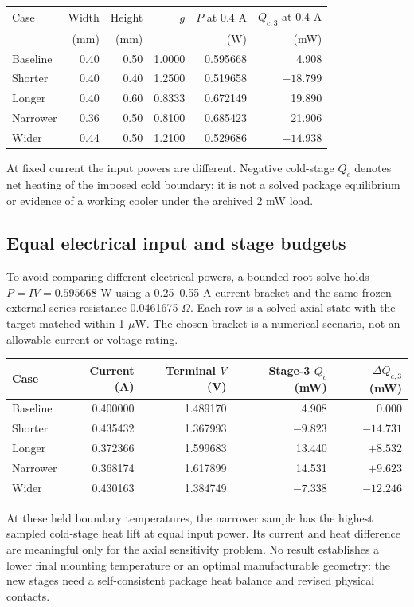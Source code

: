 \begin{center}\small
\begin{tabular}{lrrrrr}\toprule
Case & Width & Height & $g$ & $P$ at 0.4 A & $Q_{c,3}$ at 0.4 A\\
 & (mm) & (mm) & & (W) & (mW)\\\midrule
Baseline & 0.40 & 0.50 & 1.0000 & 0.595668 & 4.908\\
Shorter & 0.40 & 0.40 & 1.2500 & 0.519658 & $-18.799$\\
Longer & 0.40 & 0.60 & 0.8333 & 0.672149 & 19.890\\
Narrower & 0.36 & 0.50 & 0.8100 & 0.685423 & 21.906\\
Wider & 0.44 & 0.50 & 1.2100 & 0.529686 & $-14.938$\\\bottomrule
\end{tabular}\end{center}
At fixed current the input powers are different. Negative cold-stage $Q_c$ denotes net heating of the imposed cold boundary; it is not a solved package equilibrium or evidence of a working cooler under the archived 2 mW load.

\subsection{Equal electrical input and stage budgets}
To avoid comparing different electrical powers, a bounded root solve holds $P=IV=0.595668$ W using a 0.25--0.55 A current bracket and the same frozen external series resistance 0.0461675 $\Omega$. Each row is a solved axial state with the target matched within 1 $\mu$W. The chosen bracket is a numerical scenario, not an allowable current or voltage rating.

\begin{center}\small
\begin{tabular}{lrrrr}\toprule
Case & Current (A) & Terminal $V$ (V) & Stage-3 $Q_c$ (mW) & $\Delta Q_{c,3}$ (mW)\\\midrule
Baseline & 0.400000 & 1.489170 & 4.908 & 0.000\\
Shorter & 0.435432 & 1.367993 & $-9.823$ & $-14.731$\\
Longer & 0.372366 & 1.599683 & 13.440 & $+8.532$\\
Narrower & 0.368174 & 1.617899 & 14.531 & $+9.623$\\
Wider & 0.430163 & 1.384749 & $-7.338$ & $-12.246$\\\bottomrule
\end{tabular}\end{center}
At these held boundary temperatures, the narrower sample has the highest sampled cold-stage heat lift at equal input power. Its current and heat difference are meaningful only for the axial sensitivity problem. No result establishes a lower final mounting temperature or an optimal manufacturable geometry: the new stages need a self-consistent package heat balance and revised physical contacts.

